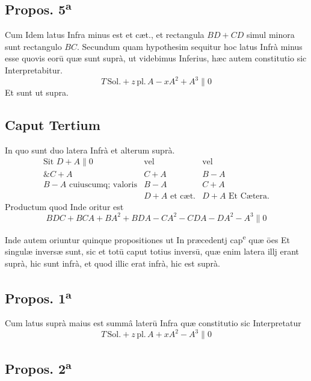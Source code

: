 \documentclass[11pt,a4paper]{article}
\begin{document}
\subsection*{Propos. 5\textsuperscript{a}}

Cum Idem latus Infra minus est et cæt., et rectangula $BD + CD$ simul minora sunt rectangulo $BC$. Secundum quam hypothesim sequitur hoc latus Infrà minus esse quovis eorū quæ sunt suprà, ut videbimus Inferius, hæc autem constitutio sic Interpretabitur.
\[ T\,\mathrm{Sol.} + z\,\mathrm{pl.}\,A - xA^{2} + A^{3} \parallel 0 \]
Et sunt ut supra.

\subsection*{Caput Tertium}

In quo sunt duo latera Infrà et alterum suprà.
\[ \begin{array}{lll} \text{Sit } D + A \parallel 0 & \text{vel} & \text{vel} \\ \text{\& } C + A & C + A & B - A \\ B - A \text{ cuiuscumq; valoris} & B - A & C + A \\ & D + A \text{ et cæt.} & D + A \text{ Et Cætera.} \end{array} \]
Productum quod Inde oritur est
\[ BDC + BCA + BA^{2} + BDA - CA^{2} - CDA - DA^{2} - A^{3} \parallel 0 \]


Inde autem oriuntur quinque propositiones ut In præcedentj cap\textsuperscript{e} quæ ōes Et singulæ inversæ sunt, sic et totū caput totius inversū, quæ enim latera illj erant suprà, hic sunt infrà, et quod illic erat infrà, hic est suprà.

\subsection*{Propos. 1\textsuperscript{a}}

Cum latus suprà maius est summâ laterū Infra quæ constitutio sic Interpretatur
\[ T\,\mathrm{Sol.} + z\,\mathrm{pl.}\,A + xA^{2} - A^{3} \parallel 0 \]

\subsection*{Propos. 2\textsuperscript{a}}
\end{document}
